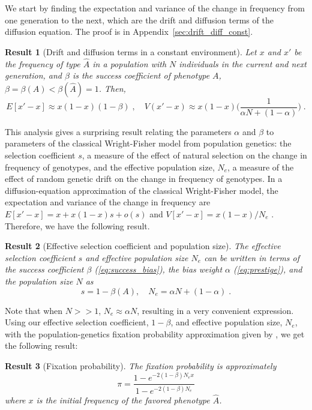 \documentclass[12pt]{extarticle}
\newtheorem{result}{Result}
\begin{document}
We start by finding the expectation and variance of the change in frequency from one generation to the next, which are the drift and diffusion terms of the diffusion equation.
The proof is in Appendix~\ref{sec:drift_diff_const}.
\\

\begin{result}[Drift and diffusion terms in a constant environment]
Let $x$ and $x'$ be the frequency of type $\hat{A}$ in a population with $N$ individuals in the current and next generation, and  $\beta$ is the success coefficient of phenotype $A$, $\beta = \beta(A) < \beta(\hat{A}) = 1$.
Then,
\begin{equation}
E[x'-x] \approx x(1-x)(1-\beta) \;, 
\quad
V(x'-x) \approx x(1-x)\Big(\frac{1}{\alpha N + (1-\alpha)}\Big) \;.
\end{equation} 
\end{result}


This analysis gives a surprising result relating the parameters $\alpha$ and $\beta$ to parameters of the classical Wright-Fisher model from population genetics:
the selection coefficient $s$, a measure of the effect of natural selection on the change in frequency of genotypes, and the effective population size, $N_e$, a measure of the effect of random genetic drift on the change in frequency of genotypes. 
In a diffusion-equation approximation of the classical Wright-Fisher model, the expectation and variance of the change in frequency are $E[x'-x]=x+x(1-x)s+o(s)$ and $V[x'-x]=x(1-x)/N_e$ \citep[eq.~7]{kimura}. 
Therefore, we have the following result.\\

\begin{result}[Effective selection coefficient and population size]\label{res:selection_coef}
The effective selection coefficient $s$ and effective population size $N_e$ can be written in terms of the success coefficient $\beta$ (\cref{eq:success_bias}), the bias weight $\alpha$ (\cref{eq:prestige}), and the population size $N$ as 
\begin{equation}
s=1-\beta(A), \quad N_e=\alpha N + (1-\alpha) \;.
\end{equation}
\end{result}

Note that when $N>>1$, $N_e \approx \alpha N$, resulting in a very convenient expression.\\

Using our effective selection coefficient, $1-\beta$, and effective population size, $N_e$, with the population-genetics fixation probability approximation given by \citet[eq.~8]{kimura}, we get the following result:
\begin{result}[Fixation probability]
The fixation probability is approximately
\begin{equation}\label{eq:kimura_p}
\pi = \frac{1-e^{-2(1-\beta)N_e x}}{1-e^{-2(1-\beta)N_e}}
\end{equation}
where $x$ is the initial frequency of the favored phenotype $\hat{A}$.
\end{result}
\end{document}
